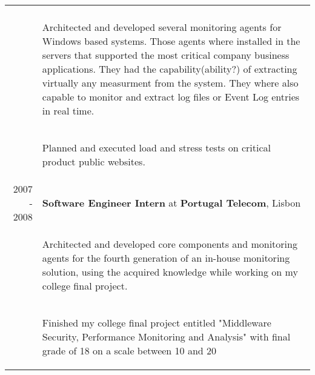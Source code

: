 \documentclass[a4paper,10pt]{article}
\begin{document}
\begin{tabular}{rp{11cm}}
\begin{compactitem}
     \end{compactitem}\vspace{-1em} \\
  & \begin{compactitem} 
     \item Architected and developed several monitoring agents for Windows based systems. Those agents where installed in the servers that supported the most critical company business applications. They had the capability(ability?) of extracting virtually any measurment from the system. They where also capable to monitor and extract log files or Event Log entries in real time.
     \end{compactitem}\vspace{-1em} \\
  & \begin{compactitem} 
     \item Planned and executed load and stress tests on critical product public websites.
     \end{compactitem}\vspace{-1em} \\
  \textsc{2007 - 2008} & \textbf{Software Engineer Intern} at \textbf{Portugal Telecom}, Lisbon\\ 
   & \begin{compactitem}
   \item Architected and developed core components and monitoring agents for the fourth generation of an in-house monitoring solution, using the acquired knowledge
   while working on my college final project.
   \end{compactitem}\vspace{-1em} \\
  & \begin{compactitem}
   \item Finished my college final project entitled "Middleware Security, Performance Monitoring and Analysis" with final grade of 18 on a scale between 10 and 20
   \end{compactitem}\vspace{-1em} \\

\end{tabular}
\end{document}
